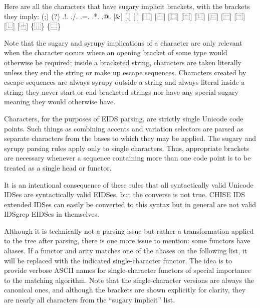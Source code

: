 \documentclass[twocolumn]{report}
\begin{document}
Here are all the characters that have sugary implicit brackets, with the
brackets they imply:  {\ttfamily (;) (?) .!. ./. .=. .*. .@. [\&] [,]
[|] [⿰] [⿱] [⿴] [⿵] [⿶] [⿷] [⿸] [⿹] [⿺] [⿻] \{⿲\} \{⿳\}}

Note that the sugary and syrupy implications of a character are only
relevant when the character occurs where an opening bracket of some type
would otherwise be required; inside a bracketed string, characters are taken
literally unless they end the string or make up escape sequences. 
Characters created by escape sequences are always syrupy outside a
string and always literal inside a string; they never start or end bracketed
strings nor have any special sugary meaning they would otherwise have.

Characters, for the purposes of EIDS parsing, are strictly single Unicode
code points.
Such things as combining accents and variation selectors are parsed as
separate characters from the bases to which they may be applied.
The sugary and syrupy parsing rules apply only to single characters.
Thus, appropriate brackets are necessary whenever a sequence containing
more than one code point is to be treated as a single head or functor.

It is an intentional consequence of these rules that all syntactically valid
Unicode IDSes are syntactically valid EIDSes, but the converse is not true. 
CHISE IDS extended IDSes can easily be converted to this syntax but in
general are not valid IDSgrep EIDSes in themselves.

Although it is technically not a parsing issue but rather a
transformation applied to the tree after parsing, there is one more
issue to mention: some functors have aliases.  If a functor and arity
matches one of the aliases on the following list, it will be replaced
with the indicated single-character functor.  The idea is to provide
verbose ASCII names for single-character functors of special
importance to the matching algorithm.  Note that the single-character
versions are always the canonical ones, and although the brackets are
shown explicitly for clarity, they are nearly all characters from the
``sugary implicit'' list.
\end{document}
